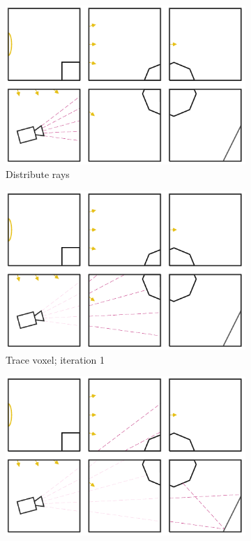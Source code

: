 \documentclass{vgtc}                          %
\begin{document}
\begin{figure}[!htb]
\centering
\begin{subfigure}{.49\columnwidth}
 \centering
  \includegraphics[width=.98\columnwidth]{drawings/Trace1.pdf}
  \caption{Distribute rays}
\end{subfigure}
\begin{subfigure}{.49\columnwidth}
 \centering
  \includegraphics[width=.98\columnwidth]{drawings/Trace2.pdf}
  \caption{Trace voxel; iteration 1}
\end{subfigure}
\begin{subfigure}{.49\columnwidth}
 \centering
  \includegraphics[width=.98\columnwidth]{drawings/Trace3.pdf}

\end{subfigure}
\end{figure}
\end{document}
